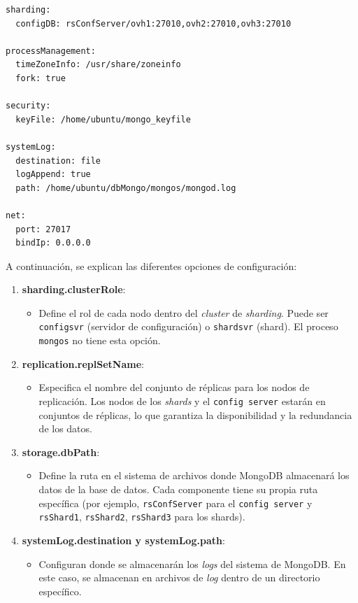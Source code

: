 \begin{verbatim}
sharding:
  configDB: rsConfServer/ovh1:27010,ovh2:27010,ovh3:27010

processManagement:
  timeZoneInfo: /usr/share/zoneinfo
  fork: true

security:
  keyFile: /home/ubuntu/mongo_keyfile

systemLog:
  destination: file
  logAppend: true
  path: /home/ubuntu/dbMongo/mongos/mongod.log

net:
  port: 27017
  bindIp: 0.0.0.0
\end{verbatim}

\noindent A continuación, se explican las diferentes opciones de configuración:

\begin{enumerate}
    \item \textbf{sharding.clusterRole}: 
    \begin{itemize}
        \item Define el rol de cada nodo dentro del \textit{cluster} de \textit{sharding}. Puede ser \texttt{configsvr} (servidor de configuración) o \texttt{shardsvr} (shard). El proceso \texttt{mongos} no tiene esta opción.
    \end{itemize}
    \item \textbf{replication.replSetName}: 
    \begin{itemize}
        \item Especifica el nombre del conjunto de réplicas para los nodos de replicación. Los nodos de los \textit{shards} y el \texttt{config server} estarán en conjuntos de réplicas, lo que garantiza la disponibilidad y la redundancia de los datos.
    \end{itemize}
    \item \textbf{storage.dbPath}: 
    \begin{itemize}
        \item Define la ruta en el sistema de archivos donde MongoDB almacenará los datos de la base de datos. Cada componente tiene su propia ruta específica (por ejemplo, \texttt{rsConfServer} para el \texttt{config server} y \texttt{rsShard1}, \texttt{rsShard2}, \texttt{rsShard3} para los shards).
    \end{itemize}
    \item \textbf{systemLog.destination y systemLog.path}: 
    \begin{itemize}
        \item Configuran donde se almacenarán los \textit{logs} del sistema de MongoDB. En este caso, se almacenan en archivos de \textit{log} dentro de un directorio específico.

\end{itemize}
\end{enumerate}
